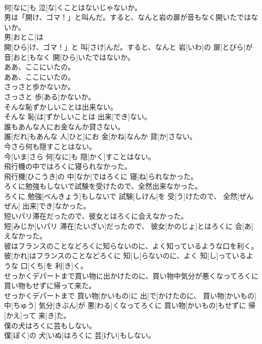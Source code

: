 \documentclass[8pt]{extreport}
\begin{document}
\begin{CJK}{UTF8}{min}
\\	何[なに]も 泣[な]くことはないじゃないか。
\\	男は「開け、ゴマ！」と叫んだ。すると、なんと岩の扉が音もなく開いたではないか。	
\\	男[おとこ]は
\\	開[ひら]け、ゴマ！」と 叫[さけ]んだ。すると、なんと 岩[いわ]の 扉[とびら]が 音[おと]もなく 開[ひら]いたではないか。
\\	ああ、ここにいたの。	
\\	ああ、ここにいたの。
\\	さっさと歩かないか。	
\\	さっさと 歩[ある]かないか。
\\	そんな恥ずかしいことは出来ない。	
\\	そんな 恥[は]ずかしいことは 出来[でき]ない。
\\	誰もあんな人にお金なんか貸さない。	
\\	誰[だれ]もあんな 人[ひと]にお 金[かね]なんか 貸[か]さない。
\\	今さら何も隠すことはない。	
\\	今[いま]さら 何[なに]も 隠[かく]すことはない。
\\	飛行機の中ではろくに寝られなかった。	
\\	飛行機[ひこうき]の 中[なか]ではろくに 寝[ね]られなかった。
\\	ろくに勉強もしないで試験を受けたので、全然出来なかった。	
\\	ろくに 勉強[べんきょう]もしないで 試験[しけん]を 受[う]けたので、 全然[ぜんぜん] 出来[でき]なかった。
\\	短いパリ滞在だったので、彼女とはろくに会えなかった。	
\\	短[みじか]いパリ 滞在[たいざい]だったので、 彼女[かのじょ]とはろくに 会[あ]えなかった。
\\	彼はフランスのことなどろくに知らないのに、よく知っているような口を利く。	
\\	彼[かれ]はフランスのことなどろくに 知[し]らないのに、よく 知[し]っているような 口[くち]を 利[き]く。
\\	せっかくデパートまで買い物に出かけたのに、買い物中気分が悪くなってろくに買い物もせずに帰って来た。	
\\	せっかくデパートまで 買い物[かいもの]に 出[で]かけたのに、 買い物[かいもの] 中[ちゅう] 気分[きぶん]が 悪[わる]くなってろくに 買い物[かいもの]もせずに 帰[かえ]って 来[き]た。
\\	僕の犬はろくに芸もしない。	
\\	僕[ぼく]の 犬[いぬ]はろくに 芸[げい]もしない。

\end{CJK}
\end{document}
